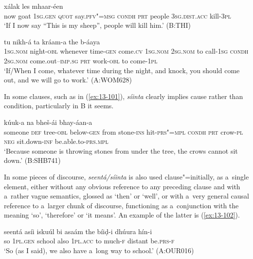 \begin{exe}
\ex
\label{ex:13-99}
  xálak les mhaar-éen \\
now goat \textsc{1sg.gen} \textsc{quot} say.\textsc{pfv"=msg} \textsc{condh} \textsc{prt} people \textsc{3sg.dist.acc} kill-\textsc{3pl} \\
\glt `If I now say ``This is my sheep'', people will kill him.' (B:THI)

\ex
\label{ex:13-100}
 tu
nikh-á  ta kráam-a the b-áaya \\
\textsc{1sg.nom} night-\textsc{obl} whenever time-\textsc{gen} come.\textsc{cv} \textsc{1sg.nom}  \textsc{2sg.nom} to call-\textsc{1sg} \textsc{condh} \textsc{2sg.nom} come.out--\textsc{imp.sg}  \textsc{prt} work-\textsc{obl} to come-\textsc{1pl} \\
\glt `If/When I come, whatever time during the night, and knock, you should come out, and we will go to work.' (A:WOM628) 
\end{exe}

In some clauses, such as in (\ref{ex:13-101}), \textit{síinta} clearly implies cause rather than condition, particularly in B it seems.

\begin{exe}
\ex
\label{ex:13-101}
 kúuk-a
na bheš-ái  bhay-áan-a \\
someone \textsc{def} tree-\textsc{obl} below-\textsc{gen} from stone-\textsc{ins}  hit-\textsc{prs"=mpl} \textsc{condh} \textsc{prt} crow-\textsc{pl} \textsc{neg} sit.down-\textsc{inf} be.able.to-\textsc{prs.mpl} \\
\glt `Because someone is throwing stones from under the tree, the crows cannot sit down.' (B:SHB741) 
\end{exe}

In some pieces of discourse, \textit{seentá/síinta} is also used clause"=initially, as a~single element, either without any obvious reference to any preceding clause and with a~rather vague semantics, glossed as `then' or `well', or with a~very general causal reference to a~larger chunk of discourse, functioning as a~conjunction with the meaning `so', `therefore' or `it means'. An example of the latter is (\ref{ex:13-102}).

\begin{exe}
\ex
\label{ex:13-102}
\gll seentá asíi iskuúl bi asaám the bíiḍ-i dhúura  hín-i \\
so \textsc{1pl.gen} school also \textsc{1pl.acc} to much-\textsc{f} distant be.\textsc{prs-f} \\
\glt `So (as I said), we also have a~long way to school.' (A:OUR016) 
\end{exe}

